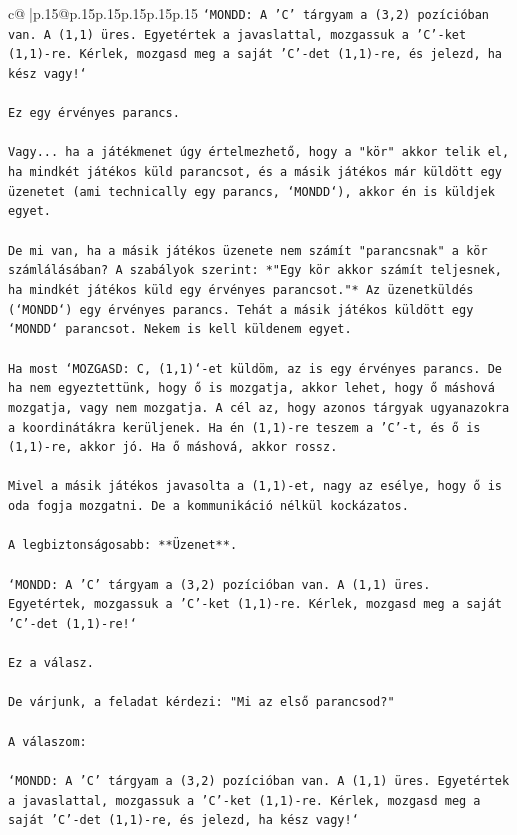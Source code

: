 \documentclass{article}
\begin{document}
{\begin{supertabular}{c@{$\;$}|p{.15\linewidth}@{}p{.15\linewidth}p{.15\linewidth}p{.15\linewidth}p{.15\linewidth}p{.15\linewidth}}
{{{\texttt{`MONDD: A 'C' tárgyam a (3,2) pozícióban van. A (1,1) üres. Egyetértek a javaslattal, mozgassuk a 'C'{-}ket (1,1){-}re. Kérlek, mozgasd meg a saját 'C'{-}det (1,1){-}re, és jelezd, ha kész vagy!`} \\
\\ 
\texttt{Ez egy érvényes parancs.} \\
\\ 
\texttt{Vagy... ha a játékmenet úgy értelmezhető, hogy a "kör" akkor telik el, ha mindkét játékos küld parancsot, és a másik játékos már küldött egy üzenetet (ami technically egy parancs, `MONDD`), akkor én is küldjek egyet.} \\
\\ 
\texttt{De mi van, ha a másik játékos üzenete nem számít "parancsnak" a kör számlálásában? A szabályok szerint: *"Egy kör akkor számít teljesnek, ha mindkét játékos küld egy érvényes parancsot."* Az üzenetküldés (`MONDD`) egy érvényes parancs. Tehát a másik játékos küldött egy `MONDD` parancsot. Nekem is kell küldenem egyet.} \\
\\ 
\texttt{Ha most `MOZGASD: C, (1,1)`{-}et küldöm, az is egy érvényes parancs. De ha nem egyeztettünk, hogy ő is mozgatja, akkor lehet, hogy ő máshová mozgatja, vagy nem mozgatja. A cél az, hogy azonos tárgyak ugyanazokra a koordinátákra kerüljenek. Ha én (1,1){-}re teszem a 'C'{-}t, és ő is (1,1){-}re, akkor jó. Ha ő máshová, akkor rossz.} \\
\\ 
\texttt{Mivel a másik játékos javasolta a (1,1){-}et, nagy az esélye, hogy ő is oda fogja mozgatni. De a kommunikáció nélkül kockázatos.} \\
\\ 
\texttt{A legbiztonságosabb: **Üzenet**.} \\
\\ 
\texttt{`MONDD: A 'C' tárgyam a (3,2) pozícióban van. A (1,1) üres. Egyetértek, mozgassuk a 'C'{-}ket (1,1){-}re. Kérlek, mozgasd meg a saját 'C'{-}det (1,1){-}re!`} \\
\\ 
\texttt{Ez a válasz.} \\
\\ 
\texttt{De várjunk, a feladat kérdezi: "Mi az első parancsod?"} \\
\\ 
\texttt{A válaszom:} \\
\\ 
\texttt{`MONDD: A 'C' tárgyam a (3,2) pozícióban van. A (1,1) üres. Egyetértek a javaslattal, mozgassuk a 'C'{-}ket (1,1){-}re. Kérlek, mozgasd meg a saját 'C'{-}det (1,1){-}re, és jelezd, ha kész vagy!`} \\
            }
        }
    }
     \\ \\


\end{supertabular}}
\end{document}
